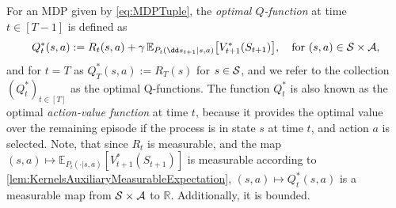 \documentclass[
    a4paper,
    11pt,
    bibliography=totoc,
    listof=totoc,      
    headinclude=true,
    cleardoublepage=empty,
]{scrbook}
\theoremstyle{plain}
\theoremstyle{definition}
\theoremstyle{remark}
\newcommand{\SetR}{\mathbb R}
\newcommand{\E}{\mathbb E}
\newcommand{\SpaceS}{{\cal S}}
\newcommand{\SpaceA}{{\cal A}}
\begin{document}
For an MDP given by \eqref{eq:MDPTuple}, the \textit{optimal 
$Q$-function} at time $t\in[T-1]$ is defined as
\begin{equation}
\label{eq:MDPQFunctions}
    Q^*_t(s,a) := 
        R_t(s,a) + \gamma\, \E_{P_t(\dd s_{t+1}|s,a)}\bigl[V^*_{t+1}(S_{t+1})\bigr],
        \quad \text{for } (s,a)\in\SpaceS\times\SpaceA,
\end{equation}
and for $t=T$ as $Q^*_T(s,a):=R_T(s)$ for $s\in\SpaceS$, and we refer to the 
collection $(Q^*_t)_{t\in[T]}$ as the optimal Q-functions. The function 
$Q^*_t$ is also known as the optimal \textit{action-value function} at time 
$t$, because it provides the optimal value over the remaining episode if the 
process is in state $s$ at time $t$, and action $a$ is selected. Note, that 
since $R_t$ is measurable, and the map $(s,a)\mapsto \E_{P_t(\cdot|s,a)}
[V^*_{t+1}(S_{t+1})]$ is measurable according to 
\cref{lem:KernelsAuxiliaryMeasurableExpectation}, $(s,a)\mapsto Q^*_t(s,a)$ is 
a measurable map from $\SpaceS\times\SpaceA$ to $\SetR$. Additionally, it is 
bounded.
\end{document}
